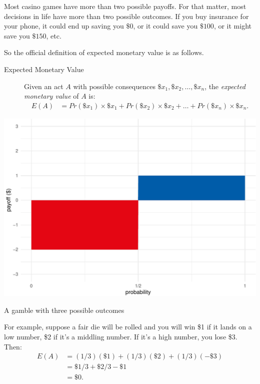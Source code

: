 \documentclass[justified]{tufte-book}
\newcommand{\p}{Pr}
\newcommand{\E}{E}
\theoremstyle{definition}
\theoremstyle{definition}
\theoremstyle{definition}
\theoremstyle{definition}
\theoremstyle{remark}
\begin{document}
Most casino games have more than two possible payoffs. For that matter, most decisions in life have more than two possible outcomes. If you buy insurance for your phone, it could end up saving you \(\$0\), or it could save you \(\$100\), or it might save you \(\$150\), etc.

So the official definition of expected monetary value is as follows.

\begin{description}
\item[Expected Monetary Value]
Given an act \(A\) with possible consequences \(\$x_1, \$x_2, \ldots, \$x_n\), the \emph{expected monetary value} of \(A\) is:
\[
  \begin{aligned}
\E(A) &= \p(\$x_1) \times \$x_1 + \p(\$x_2) \times \$x_2 + \ldots + \p(\$x_n) \times \$x_n.
  \end{aligned}
\]
\end{description}

\begin{marginfigure}
\includegraphics{_main_files/figure-latex/unnamed-chunk-91-1} \caption[A gamble with three possible outcomes]{A gamble with three possible outcomes}\label{fig:unnamed-chunk-91}
\end{marginfigure}

For example, suppose a fair die will be rolled and you will win \$1 if it lands on a low number, \$2 if it's a middling number. If it's a high number, you lose \$3. Then:
\[
  \begin{aligned}
    \E(A) &= (1/3)(\$1) + (1/3)(\$2) + (1/3)(-\$3)\\
          &= \$1/3 + \$2/3 - \$1\\
          &= \$0.
  \end{aligned}
\]
\end{document}
